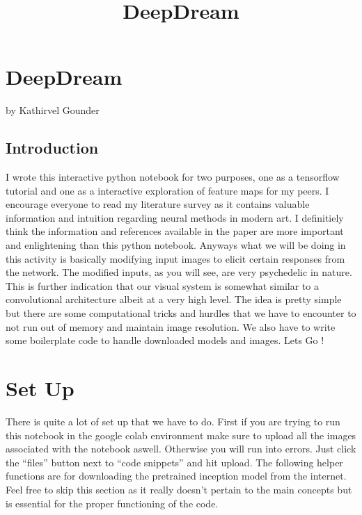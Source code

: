 \documentclass[11pt]{article}
\title{DeepDream}
\begin{document}
    
    
    \maketitle
    
    

    
    \hypertarget{deepdream}{%
\section{DeepDream}\label{deepdream}}

by Kathirvel Gounder

    \hypertarget{introduction}{%
\subsection{Introduction}\label{introduction}}

I wrote this interactive python notebook for two purposes, one as a
tensorflow tutorial and one as a interactive exploration of feature maps
for my peers. I encourage everyone to read my literature survey as it
contains valuable information and intuition regarding neural methods in
modern art. I definitiely think the information and references available
in the paper are more important and enlightening than this python
notebook. Anyways what we will be doing in this activity is basically
modifying input images to elicit certain responses from the network. The
modified inputs, as you will see, are very psychedelic in nature. This
is further indication that our visual system is somewhat similar to a
convolutional architecture albeit at a very high level. The idea is
pretty simple but there are some computational tricks and hurdles that
we have to encounter to not run out of memory and maintain image
resolution. We also have to write some boilerplate code to handle
downloaded models and images. Lets Go !

    \hypertarget{set-up}{%
\section{Set Up}\label{set-up}}

There is quite a lot of set up that we have to do. First if you are
trying to run this notebook in the google colab environment make sure to
upload all the images associated with the notebook aswell. Otherwise you
will run into errors. Just click the ``files'' button next to ``code
snippets'' and hit upload. The following helper functions are for
downloading the pretrained inception model from the internet. Feel free
to skip this section as it really doesn't pertain to the main concepts
but is essential for the proper functioning of the code.
\end{document}
